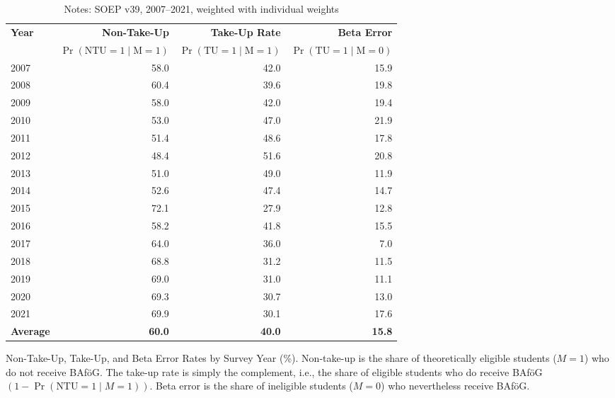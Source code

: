 \begin{table}[htbp]
\small
\centering
\begin{tabular}{l@{\hspace{2em}}r@{\hspace{2em}}r@{\hspace{2em}}r}
\toprule
\textbf{Year} & \textbf{Non-Take-Up} & \textbf{Take-Up Rate} & \textbf{Beta Error} \\
              & \(\Pr(\text{NTU} = 1 \mid \text{M} = 1)\) & \(\Pr(\text{TU} = 1 \mid \text{M} = 1)\) & \(\Pr(\text{TU} = 1 \mid \text{M} = 0)\) \\
\midrule
2007 & 58.0 & 42.0 & 15.9 \\
2008 & 60.4 & 39.6 & 19.8 \\
2009 & 58.0 & 42.0 & 19.4 \\
2010 & 53.0 & 47.0 & 21.9 \\
2011 & 51.4 & 48.6 & 17.8 \\
2012 & 48.4 & 51.6 & 20.8 \\
2013 & 51.0 & 49.0 & 11.9 \\
2014 & 52.6 & 47.4 & 14.7 \\
2015 & 72.1 & 27.9 & 12.8 \\
2016 & 58.2 & 41.8 & 15.5 \\
2017 & 64.0 & 36.0 & 7.0 \\
2018 & 68.8 & 31.2 & 11.5 \\
2019 & 69.0 & 31.0 & 11.1 \\
2020 & 69.3 & 30.7 & 13.0 \\
2021 & 69.9 & 30.1 & 17.6 \\
\midrule
\textbf{Average} & \textbf{60.0} & \textbf{40.0} & \textbf{15.8} \\
\bottomrule
\end{tabular}
\caption{\small{Non-Take-Up, Take-Up, and Beta Error Rates by Survey Year (\%). Non-take-up is the share of theoretically eligible students (\(M=1\)) who do not receive BAföG. The take-up rate is simply the complement, i.e., the share of eligible students who do receive BAföG \((1 - \Pr(\text{NTU} = 1 \mid M = 1))\). Beta error is the share of ineligible students (\(M=0\)) who nevertheless receive BAföG.}}
\caption*{\small{Notes: SOEP v39, 2007--2021, weighted with individual weights}}
\label{table:microsimulation_ntu}
\end{table}
